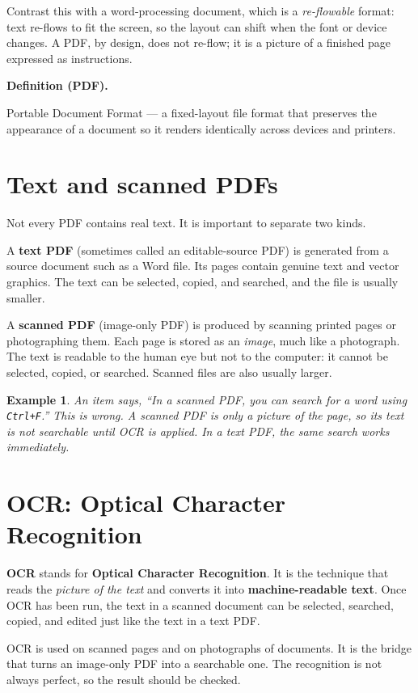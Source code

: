 \documentclass[11pt]{article}
\newtheorem{example}{Example}[section]
\newenvironment{definitionbox}[1]{%
  \par\noindent\textbf{Definition (#1).}\ \itshape
}{\par\vspace{0.3em}}
\begin{document}
Contrast this with a word-processing document, which is a \emph{re-flowable}
format: text re-flows to fit the screen, so the layout can shift when the
font or device changes. A PDF, by design, does not re-flow; it is a picture of
a finished page expressed as instructions.

\begin{definitionbox}{PDF}
Portable Document Format --- a fixed-layout file format that preserves the
appearance of a document so it renders identically across devices and
printers.
\end{definitionbox}

\section{Text and scanned PDFs}
Not every PDF contains real text. It is important to separate two kinds.

A \textbf{text PDF} (sometimes called an editable-source PDF) is generated
from a source document such as a Word file. Its pages contain genuine text and
vector graphics. The text can be selected, copied, and searched, and the file
is usually smaller.

A \textbf{scanned PDF} (image-only PDF) is produced by scanning printed pages
or photographing them. Each page is stored as an \emph{image}, much like a
photograph. The text is readable to the human eye but not to the computer: it
cannot be selected, copied, or searched. Scanned files are also usually
larger.

\begin{example}
An item says, ``In a scanned PDF, you can search for a word using
\texttt{Ctrl+F}.'' This is wrong. A scanned PDF is only a picture of the
page, so its text is not searchable until OCR is applied. In a text PDF, the
same search works immediately.
\end{example}

\section{OCR: Optical Character Recognition}
\textbf{OCR} stands for \textbf{Optical Character Recognition}. It is the
technique that reads the \emph{picture of the text} and converts it into
\textbf{machine-readable text}. Once OCR has been run, the text in a scanned
document can be selected, searched, copied, and edited just like the text in a
text PDF.

OCR is used on scanned pages and on photographs of documents. It is the
bridge that turns an image-only PDF into a searchable one. The recognition is
not always perfect, so the result should be checked.
\end{document}
